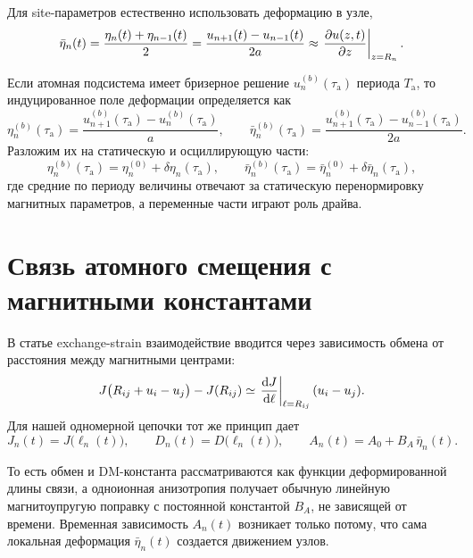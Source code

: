 \documentclass[12pt,a4paper]{article}
\newcommand{\ta}{\tau_{\mathrm{a}}}
\begin{document}
Для site-параметров естественно использовать деформацию в узле,
\begin{equation}
\bar\eta_n(t)=\frac{\eta_n(t)+\eta_{n-1}(t)}{2}
=\frac{u_{n+1}(t)-u_{n-1}(t)}{2a}
\approx \eval{\pdv{u(z,t)}{z}}_{z=R_n}.
\label{eq:eta_site}
\end{equation}

Если атомная подсистема имеет бризерное решение $u_n^{(b)}(\ta)$ периода $T_{\mathrm a}$, то индуцированное поле деформации определяется как
\begin{equation}
\eta_n^{(b)}(\ta)=\frac{u_{n+1}^{(b)}(\ta)-u_n^{(b)}(\ta)}{a},
\qquad
\bar\eta_n^{(b)}(\ta)=\frac{u_{n+1}^{(b)}(\ta)-u_{n-1}^{(b)}(\ta)}{2a}.
\label{eq:breather_strain}
\end{equation}
Разложим их на статическую и осциллирующую части:
\begin{equation}
\eta_n^{(b)}(\ta)=\eta_n^{(0)}+\delta\eta_n(\ta),
\qquad
\bar\eta_n^{(b)}(\ta)=\bar\eta_n^{(0)}+\delta\bar\eta_n(\ta),
\label{eq:split_eta}
\end{equation}
где средние по периоду величины отвечают за статическую перенормировку магнитных параметров, а переменные части играют роль драйва.

\section{Связь атомного смещения с магнитными константами}
В статье \cite{Tereshchenko2022} exchange-strain взаимодействие вводится через зависимость обмена от расстояния между магнитными центрами:
\begin{equation}
J\bigl(R_{ij}+u_i-u_j\bigr)-J(R_{ij})
\simeq
\eval{\dv{J}{\ell}}_{\ell=R_{ij}} (u_i-u_j).
\label{eq:exchange_article_style}
\end{equation}
Для нашей одномерной цепочки тот же принцип дает
\begin{equation}
J_n(t)=J\bigl(\ell_n(t)\bigr),
\qquad
D_n(t)=D\bigl(\ell_n(t)\bigr),
\qquad
A_n(t)=A_0+B_A\,\bar\eta_n(t).
\label{eq:JDA_functional}
\end{equation}

То есть обмен и DM-константа рассматриваются как функции деформированной длины связи, а одноионная анизотропия получает обычную линейную магнитоупругую поправку с постоянной константой $B_A$, не зависящей от времени. Временная зависимость $A_n(t)$ возникает только потому, что сама локальная деформация $\bar\eta_n(t)$ создается движением узлов.
\end{document}
